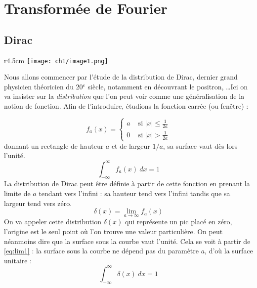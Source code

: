 \setcounter{chapter}{-1}
\chapter{Transformée de Fourier}
\section{Dirac}
\begin{wrapfigure}[15]{r}{4.5cm}
\vspace{-5mm}
\texttt{[image: ch1/image1.png]}
\end{wrapfigure}
Nous allons commencer par l'étude de la distribution de Dirac, dernier grand 
physicien théoricien du 20$^e$ siècle, notamment en découvrant le positron, 
\dots Ici on va insister sur la \textit{distribution} que l'on peut voir comme 
une généralisation de la notion de fonction. Afin de l'introduire, étudions la 
fonction carrée (ou fenêtre) :


\begin{equation}
f_a(x) =\left\{\begin{array}{ll}
a &\text{ si } |x| \leq \frac{1}{2a}\\
0 &\text{ si } |x| > \frac{1}{2a}
\end{array}\right.
\end{equation}
donnant un rectangle de hauteur $a$ et de largeur $1/a$, sa surface vaut dès lors 
l'unité. 
\begin{equation}
\int_{-\infty}^\infty f_a(x)\ dx = 1
\label{eq:lim1}
\end{equation}
La distribution de Dirac peut être définie à partir de cette fonction 
en prenant la limite de $a$ tendant vers l'infini : sa hauteur tend vers 
l'infini tandis que sa largeur tend vers zéro.
\begin{equation}
\delta(x) = \lim\limits_{a\rightarrow\infty} f_a(x)%
\end{equation}
On va appeler cette distribution $\delta(x)$ qui représente un pic placé en 
zéro, l'origine est le seul point où l'on trouve une valeur particulière. On 
peut néanmoins dire que la surface sous la courbe vaut l'unité. Cela se 
voit à partir de \autoref{eq:lim1} : la surface sous la courbe ne dépend pas 
du paramètre $a$, d'où la surface unitaire :
\begin{equation}
\int_{-\infty}^\infty \delta(x)\ dx = 1
\end{equation}

